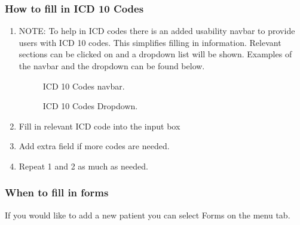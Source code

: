\documentclass[14pt, a4paper]{article}
\begin{document}
	\subsubsection{How to fill in ICD 10 Codes}
		\begin{enumerate}
			\item NOTE: To help in ICD codes there is an added usability navbar to provide users with ICD 10 codes. This simplifies filling in information. Relevant sections can be clicked on and a dropdown list will be shown. Examples of the navbar and the dropdown can be found below.
			\begin{figure}[H]
				\centerline{}
				\caption{ICD 10 Codes navbar.}
				\label{fig:forms2}
			\end{figure}
			\begin{figure}[H]
				\centerline{}
				\caption{ICD 10 Codes Dropdown.}
				\label{fig:forms3}
			\end{figure}
			\item Fill in relevant ICD code into the input box
			\item Add extra field if more codes are needed.
			\item Repeat 1 and 2 as much as needed.
		\end{enumerate}
		\subsubsection{When to fill in forms}
	If you would like to add a new patient you can select Forms on the menu tab.
	
\end{document}
